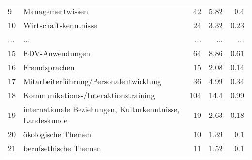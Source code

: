\begin{longtable}{lXrrr}
        9 & \multicolumn{1}{X}{Managementwissen} & %
          \num{42} &
          \num[round-mode=places,round-precision=2]{5.82} &
          \num[round-mode=places,round-precision=2]{0.4} \\
        10 & \multicolumn{1}{X}{Wirtschaftskenntnisse} & %
          \num{24} &
          \num[round-mode=places,round-precision=2]{3.32} &
          \num[round-mode=places,round-precision=2]{0.23} \\
       ... & ... & ... & ... & ... \\
        15 & \multicolumn{1}{X}{EDV-Anwendungen} & %
          \num{64} &
          \num[round-mode=places,round-precision=2]{8.86} &
          \num[round-mode=places,round-precision=2]{0.61} \\

        16 & \multicolumn{1}{X}{Fremdsprachen} & %
          \num{15} &
          \num[round-mode=places,round-precision=2]{2.08} &
          \num[round-mode=places,round-precision=2]{0.14} \\

        17 & \multicolumn{1}{X}{Mitarbeiterführung/Personalentwicklung} & %
          \num{36} &
          \num[round-mode=places,round-precision=2]{4.99} &
          \num[round-mode=places,round-precision=2]{0.34} \\

        18 & \multicolumn{1}{X}{Kommunikations-/Interaktionstraining} & %
          \num{104} &
          \num[round-mode=places,round-precision=2]{14.4} &
          \num[round-mode=places,round-precision=2]{0.99} \\

        19 & \multicolumn{1}{X}{internationale Beziehungen, Kulturkenntnisse, Landeskunde} & %
          \num{19} &
          \num[round-mode=places,round-precision=2]{2.63} &
          \num[round-mode=places,round-precision=2]{0.18} \\

        20 & \multicolumn{1}{X}{ökologische Themen} & %
          \num{10} &
          \num[round-mode=places,round-precision=2]{1.39} &
          \num[round-mode=places,round-precision=2]{0.1} \\

        21 & \multicolumn{1}{X}{berufsethische Themen} & %
          \num{11} &
          \num[round-mode=places,round-precision=2]{1.52} &
          \num[round-mode=places,round-precision=2]{0.1} \\


\end{longtable}
